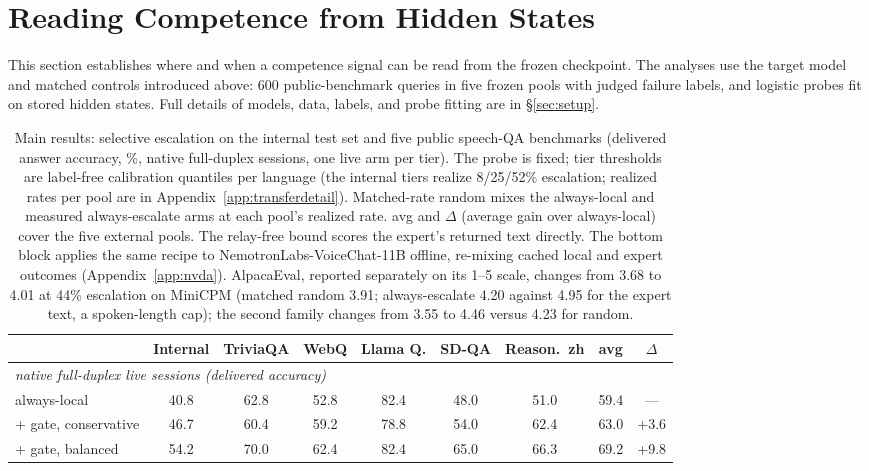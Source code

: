 \section{Reading Competence from Hidden States}
\label{sec:signal}

This section establishes where and when a competence signal can be
read from the frozen checkpoint. The analyses use the target model and
matched controls introduced above: 600 public-benchmark queries in
five frozen pools with judged failure labels, and logistic probes fit
on stored hidden states. Full details of models, data, labels, and
probe fitting are in \S\ref{sec:setup}.

\begin{table}[t]
\centering\scriptsize
\setlength{\tabcolsep}{3.5pt}
\renewcommand{\arraystretch}{0.92}
\caption{Main results: selective escalation on the internal test set
and five public speech-QA benchmarks (delivered answer accuracy, \%,
native full-duplex sessions, one live arm per tier). The probe is
fixed; tier thresholds are label-free calibration quantiles per
language (the internal tiers realize 8/25/52\% escalation;
realized rates per pool are in Appendix~\ref{app:transferdetail}).
Matched-rate random mixes the always-local and measured
always-escalate arms at each pool's realized rate. avg and $\Delta$
(average gain over always-local) cover the five external pools. The
relay-free bound scores the expert's returned text directly. The
bottom block applies the same recipe to NemotronLabs-VoiceChat-11B
offline, re-mixing cached local and expert outcomes
(Appendix~\ref{app:nvda}). AlpacaEval, reported separately on its
1--5 scale, changes from 3.68 to 4.01 at 44\% escalation on MiniCPM
(matched random 3.91; always-escalate 4.20 against 4.95 for the
expert text, a spoken-length cap); the second family changes from
3.55 to 4.46 versus 4.23 for random.}
\label{tab:transfer}
\begin{tabular}{lcccccccc}
\toprule
& Internal & TriviaQA & WebQ & Llama Q. & SD-QA & Reason.\ zh & avg & $\Delta$ \\
\midrule
\multicolumn{9}{l}{\emph{native full-duplex live sessions (delivered accuracy)}} \\
always-local          & 40.8 & 62.8 & 52.8 & 82.4 & 48.0 & 51.0 & 59.4 & --- \\
\;+ gate, conservative & 46.7 & 60.4 & 59.2 & 78.8 & 54.0 & 62.4 & 63.0 & +3.6 \\
\;+ gate, balanced     & 54.2 & 70.0 & 62.4 & 82.4 & 65.0 & 66.3 & 69.2 & +9.8 \\

\end{tabular}
\end{table}
